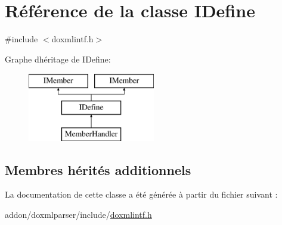\hypertarget{class_i_define}{}\section{Référence de la classe I\+Define}
\label{class_i_define}


{\ttfamily \#include $<$doxmlintf.\+h$>$}

Graphe d\textquotesingle{}héritage de I\+Define\+:\begin{figure}[H]
\begin{center}
\leavevmode
\includegraphics[height=3.000000cm]{class_i_define}
\end{center}
\end{figure}
\subsection*{Membres hérités additionnels}


La documentation de cette classe a été générée à partir du fichier suivant \+:\begin{DoxyCompactItemize}
\item 
addon/doxmlparser/include/\hyperlink{include_2doxmlintf_8h}{doxmlintf.\+h}\end{DoxyCompactItemize}
